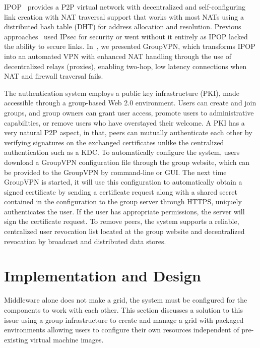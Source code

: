 \documentclass{sig-alternate}
\begin{document}
IPOP~\cite{ipop} provides a P2P virtual network with decentralized and
self-configuring link creation with NAT traversal support that works with
most NATs using a distributed hash table (DHT) for address
allocation and resolution.  Previous approaches~\cite{grid_appliance} used
IPsec for security or went without it entirely as IPOP lacked the ability to
secure links.  In~\cite{groupvpn}, we presented GroupVPN, which transforms IPOP
into an automated VPN with enhanced NAT handling through the use of
decentralized relays (proxies), enabling two-hop, low latency connections when
NAT and firewall traversal fails.

The authentication system employs a public key infrastructure (PKI), made
accessible through a group-based Web 2.0 environment.  Users can create and
join groups, and group owners can grant user access, promote users to
administrative capabilities, or remove users who have overstayed their
welcome.  A PKI has a very natural P2P aspect, in that, peers can mutually
authenticate each other by verifying signatures on the exchanged certificates
unlike the centralized authentication such as a KDC.  To automatically configure
the system, users download a GroupVPN configuration file through the group
website, which can be provided to the GroupVPN by command-line or GUI.  The
next time GroupVPN is started, it will use this configuration to automatically
obtain a signed certificate by sending a certificate request along with a
shared secret contained in the configuration to the group server through HTTPS,
uniquely authenticates the user.  If the user has appropriate permissions, the
server will sign the certificate request.  To remove peers, the system supports
a reliable, centralized user revocation list located at the group website and
decentralized revocation by broadcast and distributed data stores.

\section{Implementation and Design}
\label{implementation}
Middleware alone does not make a grid, the system must be configured for the
components to work with each other.  This section discusses a solution to this
issue using a group infrastructure to create and manage a grid with packaged
environments allowing users to configure their own resources independent of
pre-existing virtual machine images.
\end{document}
